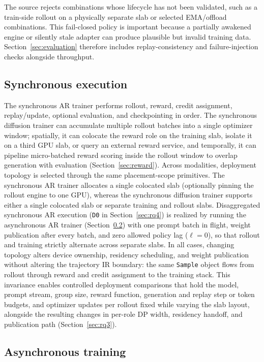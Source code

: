 \documentclass[10pt]{article}
\newcommand{\sample}{\texttt{Sample}}
\begin{document}
The source rejects combinations whose lifecycle has not been validated, such as a train-side rollout on a physically separate slab or selected EMA/offload combinations.
This fail-closed policy is important because a partially awakened engine or silently stale adapter can produce plausible but invalid training data.
Section~\ref{sec:evaluation} therefore includes replay-consistency and failure-injection checks alongside throughput.

\subsection{Synchronous execution}

The synchronous AR trainer performs rollout, reward, credit assignment, replay/update, optional evaluation, and checkpointing in order.
The synchronous diffusion trainer can accumulate multiple rollout batches into a single optimizer window; spatially, it can colocate the reward role on the training slab, isolate it on a third GPU slab, or query an external reward service, and temporally, it can pipeline micro-batched reward scoring inside the rollout window to overlap generation with evaluation (Section~\ref{sec:reward}).
Across modalities, deployment topology is selected through the same placement-scope primitives.
The synchronous AR trainer allocates a single colocated slab (optionally pinning the rollout engine to one GPU), whereas the synchronous diffusion trainer supports either a single colocated slab or separate training and rollout slabs.
Disaggregated synchronous AR execution (\texttt{D0} in Section~\ref{sec:rq4}) is realized by running the asynchronous AR trainer (Section~\ref{sec:async}) with one prompt batch in flight, weight publication after every batch, and zero allowed policy lag ($\ell=0$), so that rollout and training strictly alternate across separate slabs.
In all cases, changing topology alters device ownership, residency scheduling, and weight publication without altering the trajectory IR boundary: the same \sample{} object flows from rollout through reward and credit assignment to the training stack.
This invariance enables controlled deployment comparisons that hold the model, prompt stream, group size, reward function, generation and replay step or token budgets, and optimizer updates per rollout fixed while varying the slab layout, alongside the resulting changes in per-role DP width, residency handoff, and publication path (Section~\ref{sec:rq3}).

\subsection{Asynchronous training}
\label{sec:async}
\end{document}
